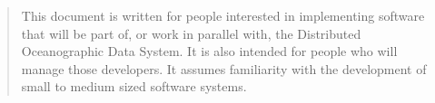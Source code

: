 %
%
%

\small

\begin{quotation}
  This document is written for people interested in implementing software
  that will be part of, or work in parallel with, the Distributed
  Oceanographic Data System. It is also intended for people who will manage
  those developers. It assumes familiarity with the development of small to
  medium sized software systems.
\end{quotation}

\normalsize
